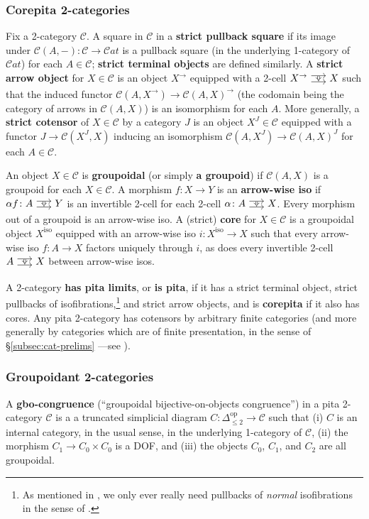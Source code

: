 \documentclass{amsart}
\newcommand\Cat{\mathcal{C}at}
\newcommand\cC{\mathcal{C}}
\newcommand\defword[1]{{\boldmath \textbf{#1}}}
\newcommand\iso{\mathrm{iso}}
\newcommand\op{\mathrm{op}}
\newcommand\tocell{\hspace{-5pt}\begin{tikzcd}[column sep=15pt, ampersand replacement=\&]{}\ar[r, shift left=3pt, ""{name=top}]\ar[r, shift right=3pt, ""'{name=bot}, start anchor=east, end anchor=west]\&{}\ar[Rightarrow, from=top, to=bot, shorten=0.5pt]\end{tikzcd}\hspace{-5pt}}
\newcommand\prerefpost[3]{%
  \texorpdfstring%
    {\hyperref[#2]{#1\ref*{#2}#3}}%
    {#1\ref*{#2}#3}%
}
\newcommand\sref[1]{\prerefpost{\S}{#1}{}}
\theoremstyle{definition}
\theoremstyle{remark}
\theoremstyle{plainwithref}
\begin{document}
\subsubsection{Corepita 2-categories} \label{subsubsec:corepita-prelims}
Fix a 2-category \( \cC \).
A square in \( \cC \) in a \defword{strict pullback square} if its image under \( \cC(A,-) \colon \cC \to \Cat \) is a pullback square (in the underlying 1-category of \( \Cat \)) for each \( A \in \cC \); \defword{strict terminal objects} are defined similarly.
A \defword{strict arrow object} for \( X \in \cC \) is an object \( X^\to \) equipped with a 2-cell \( X^\to \tocell X \) such that the induced functor \( \cC(A, X^\to) \to \cC(A, X)^\to \) (the codomain being the category of arrows in \( \cC(A, X) \)) is an isomorphism for each \( A \).
More generally, a \defword{strict cotensor} of \( X \in \cC \) by a category \( J \) is an object \( X^J \in \cC \) equipped with a functor \( J \to \cC(X^J, X) \) inducing an isomorphism \( \cC(A, X^J) \to \cC(A, X)^J \) for each \( A \in \cC \).

An object \( X \in \cC \) is \defword{groupoidal} (or simply \defword{a groupoid}) if \( \cC(A, X) \) is a groupoid for each \( X \in \cC \).
A morphism \( f \colon X \to Y \) is an \defword{arrow-wise iso} if \( \alpha f \colon A \tocell Y \) is an invertible 2-cell for each 2-cell \( \alpha \colon A \tocell X \).
Every morphism out of a groupoid is an arrow-wise iso.
A (strict) \defword{core} for \( X \in \cC \) is a groupoidal object \( X^\iso \) equipped with an arrow-wise iso \( i \colon X^\iso \to X \) such that every arrow-wise iso \( f \colon A \to X \) factors uniquely through \( i \), as does every invertible 2-cell \( A \tocell X \) between arrow-wise isos.

A 2-category \defword{has pita limits}, or \defword{is pita}, if it has a strict terminal object, strict pullbacks of isofibrations,\footnote{%
  As mentioned in \cite{helfer-topoi-in-topoi}, we only ever really need pullbacks of \emph{normal} isofibrations in the sense of \cite{bourke-accessible-aspects}.
}
and strict arrow objects, and is \defword{corepita} if it also has cores.
Any pita 2-category has cotensors by arbitrary finite categories (and more generally by categories which are of finite presentation, in the sense of \sref{subsec:cat-prelims}---see \cite[Proposition~2.7]{power-robinson-pie-limits}).

\subsubsection{Groupoidant 2-categories}
A \defword{gbo-congruence} (``groupoidal bijective-on-objects congruence'') in a pita 2-category \( \cC \) is a a truncated simplicial diagram \( C \colon \Delta_{\le 2}^\op \to \cC \) such that (i) \( C \) is an internal category, in the usual sense, in the underlying 1-category of \( \cC \), (ii) the morphism \( C_1 \to C_0 \times C_0 \) is a DOF, and (iii) the objects \( C_0 \), \( C_1 \), and \( C_2 \) are all groupoidal.
\end{document}
